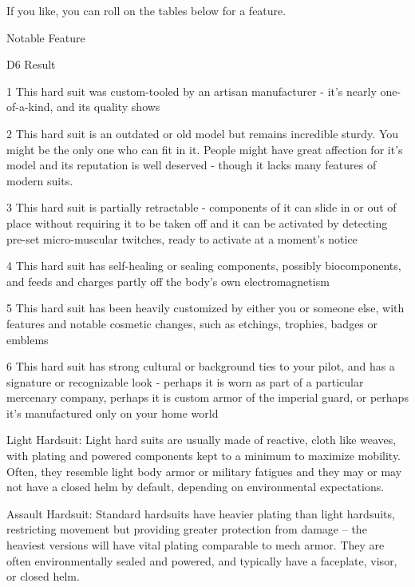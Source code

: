 If you like, you can roll on the tables below for a feature.
 

                                                       Notable Feature
 

  D6     Result 

  1      This hard suit was custom-tooled by an artisan manufacturer - it’s nearly one-of-a-kind, and its quality shows 

  2      This hard suit is an outdated or old model but remains incredible sturdy. You might be the only one who can  
         fit in it. People might have great affection for it’s model and its reputation is well deserved - though it lacks  
         many features of modern suits. 

  3      This hard suit is partially retractable - components of it can slide in or out of place without requiring it to be  
         taken off and it can be activated by detecting pre-set micro-muscular twitches, ready to activate at a  
         moment’s notice 

  4      This hard suit has self-healing or sealing components, possibly biocomponents, and feeds and charges  
         partly off the body’s own electromagnetism 

  5      This hard suit has been heavily customized by either you or someone else, with features and notable  
         cosmetic changes, such as etchings, trophies, badges or emblems 

  6      This hard suit has strong cultural or background ties to your pilot, and has a signature or recognizable look -  
         perhaps it is worn as part of a particular mercenary company, perhaps it is custom armor of the imperial  
         guard, or perhaps it’s manufactured only on your home world 

Light Hardsuit: Light hard suits are usually made of reactive, cloth like weaves, with plating and  
powered components kept to a minimum to maximize mobility. Often, they resemble light body  
armor or military fatigues and they may or may not have a closed helm by default, depending on  
environmental expectations. 
 

                                                                                                                           


Assault Hardsuit: Standard hardsuits have heavier plating than light hardsuits, restricting  
movement but providing greater protection from damage -- the heaviest versions will have vital  
plating comparable to mech armor. They are often environmentally sealed and powered, and  
typically have a faceplate, visor, or closed helm.
 

